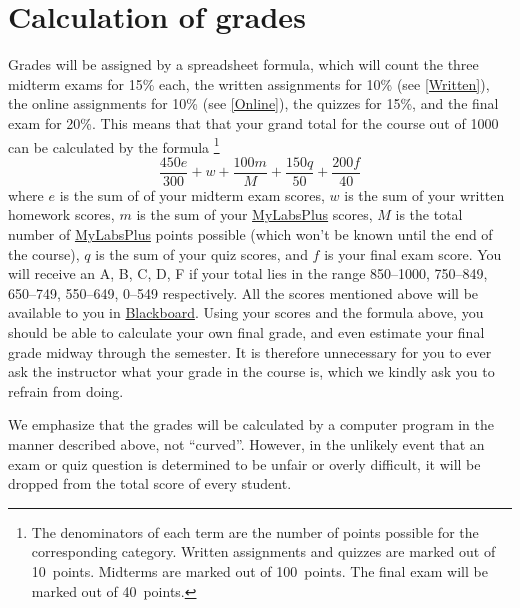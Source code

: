 \documentclass[11pt]{article}
\begin{document}
\section{Calculation of grades}\label{Assessment}
Grades will be assigned by a spreadsheet formula, which will count
the three midterm exams for 15\% each,
the written assignments for 10\% (see \autoref{Written}),
the online assignments for 10\% (see \autoref{Online}),
the quizzes for 15\%, and the final exam for 20\%.
This means that that your grand total for the course out of 1000
can be calculated by the formula
\footnote{The denominators of each term are the number of points possible
for the corresponding category. Written assignments and quizzes are marked
out of 10~points. Midterms are marked out of 100~points. The final exam
will be marked out of 40~points.}
\[\frac{450e}{300}+w+\frac{100m}{M}+\frac{150q}{50}+\frac{200f}{40}\]
where $e$ is the sum of of your midterm exam scores,
$w$ is the sum of your written homework scores, $m$ is the sum of your
\href{http://iastate.mylabsplus.com}{MyLabsPlus} scores,
$M$ is the total number of 
\href{http://iastate.mylabsplus.com}{MyLabsPlus} points possible
(which won't be known until the end of the course), $q$ is the sum
of your quiz scores, and $f$ is your final exam score.
You will receive an A, B, C, D, F if your total lies in the range
850--1000, 750--849, 650--749, 550--649, 0--549 respectively.
All the scores mentioned above will be available to you in
\href{https://bb.its.iastate.edu}{Blackboard}. Using your scores
and the formula above, you should be able to calculate your own final grade,
and even estimate your final grade midway through the semester.
It is therefore unnecessary for you to ever ask the instructor
what your grade in the course is, which we kindly ask you to refrain from
doing.

We emphasize that the grades will be calculated by a computer program in the manner described
above, not ``curved''. However, in the unlikely event that an exam or quiz question is determined
to be unfair or overly difficult, it will be dropped from the total score of
every student.
\end{document}
